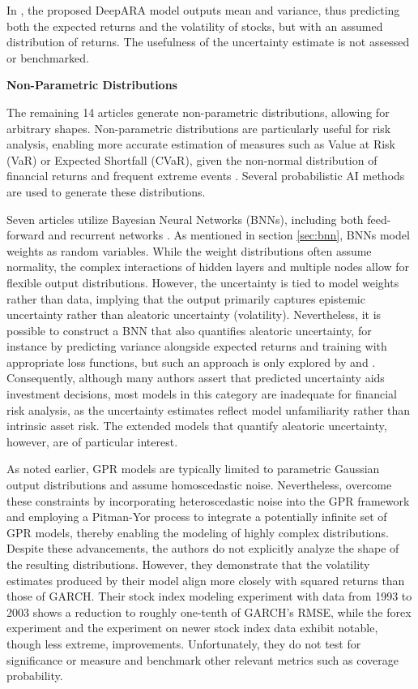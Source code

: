 In \textcite{Li2024DeepAR}, the proposed DeepARA model outputs mean and variance, thus predicting both the expected returns and the volatility of stocks, but with an assumed distribution of returns. The usefulness of the uncertainty estimate is not assessed or benchmarked.

\textbf{Non-Parametric Distributions}

The remaining 14 articles generate non-parametric distributions, allowing for arbitrary shapes. Non-parametric distributions are particularly useful for risk analysis, enabling more accurate estimation of measures such as Value at Risk (VaR) or Expected Shortfall (CVaR), given the non-normal distribution of financial returns and frequent extreme events \parencite{Peir1994TheDO}. Several probabilistic AI methods are used to generate these distributions.

Seven articles utilize Bayesian Neural Networks (BNNs), including both feed-forward and recurrent networks \parencite{cocco2021predictions, Hassan2024Bitcoin, Golnari2024Cryptocurrency, soleymani2022longterm, Dixon2022Industrial, chandra2021bayesian, hortua2024forecasting}. As mentioned in section \ref{sec:bnn}, BNNs model weights as random variables. While the weight distributions often assume normality, the complex interactions of hidden layers and multiple nodes allow for flexible output distributions. However, the uncertainty is tied to model weights rather than data, implying that the output primarily captures epistemic uncertainty rather than aleatoric uncertainty (volatility). Nevertheless, it is possible to construct a BNN that also quantifies aleatoric uncertainty, for instance by predicting variance alongside expected returns and training with appropriate loss functions, but such an approach is only explored by \textcite{hortua2024forecasting} and \textcite{soleymani2022longterm}. Consequently, although many authors assert that predicted uncertainty aids investment decisions, most models in this category are inadequate for financial risk analysis, as the uncertainty estimates reflect model unfamiliarity rather than intrinsic asset risk. The extended models that quantify aleatoric uncertainty, however, are of particular interest.

As noted earlier, GPR models are typically limited to parametric Gaussian output distributions and assume homoscedastic noise. Nevertheless, \textcite{Platanios2014gpr} overcome these constraints by incorporating heteroscedastic noise into the GPR framework and employing a Pitman-Yor process to integrate a potentially infinite set of GPR models, thereby enabling the modeling of highly complex distributions. Despite these advancements, the authors do not explicitly analyze the shape of the resulting distributions. However, they demonstrate that the volatility estimates produced by their model align more closely with squared returns than those of GARCH. Their stock index modeling experiment with data from 1993 to 2003 shows a reduction to roughly one-tenth of GARCH's RMSE, while the forex experiment and the experiment on newer stock index data exhibit notable, though less extreme, improvements. Unfortunately, they do not test for significance or measure and benchmark other relevant metrics such as coverage probability.

